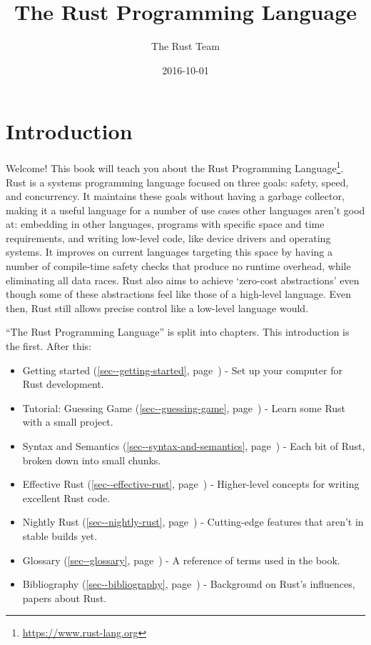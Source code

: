 \documentclass[a4paper,]{book}
\title{The Rust Programming Language}
\author{The Rust Team}
\date{2016-10-01}
\renewcommand*{\hyperlink}[2]{%
 #2 (\autoref{#1}, page~\pageref{#1})}
\renewcommand{\href}[2]{#2\footnote{\url{#1}}}
\providecommand{\tightlist}{%
  \setlength{\itemsep}{0pt}\setlength{\parskip}{0pt}}
\begin{document}
  \maketitle



{
  \hypersetup{linkcolor=black}
  \setcounter{tocdepth}{2}
  \tableofcontents
  \newpage
}

\chapter{Introduction}\label{introduction}

Welcome! This book will teach you about the
\href{https://www.rust-lang.org}{Rust Programming Language}. Rust is a
systems programming language focused on three goals: safety, speed, and
concurrency. It maintains these goals without having a garbage
collector, making it a useful language for a number of use cases other
languages aren't good at: embedding in other languages, programs with
specific space and time requirements, and writing low-level code, like
device drivers and operating systems. It improves on current languages
targeting this space by having a number of compile-time safety checks
that produce no runtime overhead, while eliminating all data races. Rust
also aims to achieve `zero-cost abstractions' even though some of these
abstractions feel like those of a high-level language. Even then, Rust
still allows precise control like a low-level language would.

``The Rust Programming Language'' is split into chapters. This
introduction is the first. After this:

\begin{itemize}
\tightlist
\item
  \protect\hyperlink{sec--getting-started}{Getting started} - Set up
  your computer for Rust development.
\item
  \protect\hyperlink{sec--guessing-game}{Tutorial: Guessing Game} -
  Learn some Rust with a small project.
\item
  \protect\hyperlink{sec--syntax-and-semantics}{Syntax and Semantics} -
  Each bit of Rust, broken down into small chunks.
\item
  \protect\hyperlink{sec--effective-rust}{Effective Rust} - Higher-level
  concepts for writing excellent Rust code.
\item
  \protect\hyperlink{sec--nightly-rust}{Nightly Rust} - Cutting-edge
  features that aren't in stable builds yet.
\item
  \protect\hyperlink{sec--glossary}{Glossary} - A reference of terms
  used in the book.
\item
  \protect\hyperlink{sec--bibliography}{Bibliography} - Background on
  Rust's influences, papers about Rust.
\end{itemize}
\end{document}
